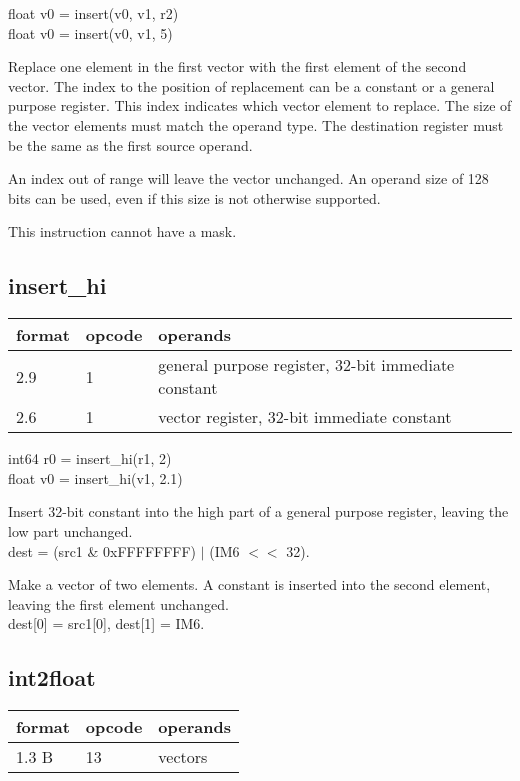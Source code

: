 \documentclass[forwardcom.tex]{subfiles}
\begin{document}
float v0 = insert(v0, v1, r2) \\
float v0 = insert(v0, v1, 5)
\vv

Replace one element in the first vector with the first element of the second vector. 
The index to the position of replacement can be a constant or a general purpose register. This index indicates which vector element to replace. 
The size of the vector elements must match the operand type. 
The destination register must be the same as the first source operand.
\vv

An index out of range will leave the vector unchanged. An operand size of 128 bits can be used, even if this size is not otherwise supported.
\vv

This instruction cannot have a mask.
\vv

\subsection{insert\_hi}
\label{table:insertHiInstruction}
\begin{tabular}{|p{12mm}|p{15mm}|p{100mm}|}
\hline
\bfseries format & \bfseries opcode & \bfseries operands \\ \hline
2.9 & 1 & general purpose register, 32-bit immediate constant \\ \hline
2.6 & 1 & vector register, 32-bit immediate constant \\ \hline
\end{tabular}
\vv

int64 r0 = insert\_hi(r1, 2) \\
float v0 = insert\_hi(v1, 2.1)
\vv

Insert 32-bit constant into the high part of a
general purpose register, leaving the low part
unchanged. \\
dest = (src1 \& 0xFFFFFFFF) $|$ (IM6 $<<$ 32).
\vv

Make a vector of two elements. A constant is inserted into the second element, leaving the first element unchanged.\\
dest[0] = src1[0], dest[1] = IM6.
\vv


\subsection{int2float}
\label{table:int2floatInstruction}
\begin{tabular}{|p{12mm}|p{15mm}|p{100mm}|}
\hline
\bfseries format & \bfseries opcode & \bfseries operands \\ \hline
1.3 B & 13 & vectors \\ \hline
\end{tabular}
\vv
\end{document}
